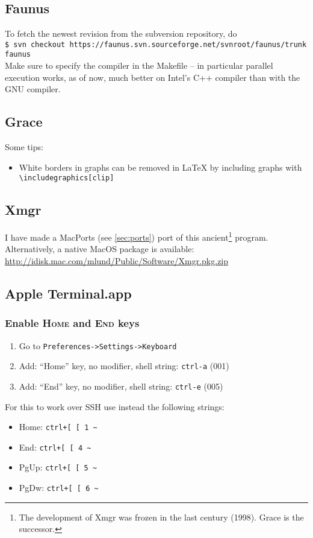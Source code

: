 \documentclass[a4paper,10pt]{article}
\begin{document}
\subsection{Faunus}
To fetch the newest revision from the subversion repository, do\\

\verb+$ svn checkout https://faunus.svn.sourceforge.net/svnroot/faunus/trunk faunus+\\

\noindent Make sure to specify the compiler in the Makefile -- in particular parallel execution works, as of now, much better on Intel's C++ compiler than with the GNU compiler.

\subsection{\label{sec:grace}Grace}
Some tips:
\begin{itemize}
\item White borders in graphs can be removed in \LaTeX{} by including graphs with\\

\verb+\includegraphics[clip]+
\end{itemize}

\subsection{Xmgr}
I have made a MacPorts (see \ref{sec:ports}) port of this ancient\footnote{The development of Xmgr was frozen in the last century (1998). Grace is the successor.} program. Alternatively, a native MacOS package is available:\\

\url{http://idisk.mac.com/mlund/Public/Software/Xmgr.pkg.zip}\\

\subsection{Apple Terminal.app}
\subsubsection{Enable \textsc{Home} and \textsc{End} keys}
\begin{enumerate}
\item Go to \verb"Preferences->Settings->Keyboard"
\item Add: ``Home'' key, no modifier, shell string: \verb"ctrl-a" (001)
\item Add: ``End'' key, no modifier, shell string: \verb"ctrl-e" (005)
\end{enumerate}
For this to work over SSH use instead the following strings:
\begin{itemize}
\item Home: \verb"ctrl+[ [ 1 ~"
\item End: \verb"ctrl+[ [ 4 ~"
\item PgUp: \verb"ctrl+[ [ 5 ~"
\item PgDw: \verb"ctrl+[ [ 6 ~"
\end{itemize}
\end{document}
